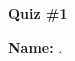 \begin{center} \textbf
{
    \large \vspace{2mm}Quiz \#1
}
\end{center}

\textbf{Name:} \hrulefill.
\vspace{-4mm}

